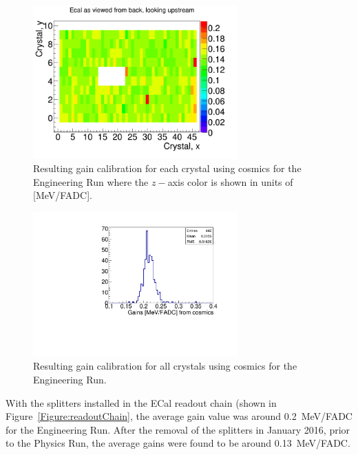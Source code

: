\begin{figure}[htb]
  \centering
      \includegraphics[width=0.7\textwidth]{pics/performance/cosmicGains2015.png}
  \caption[Resulting 2015 gain calibration in the ECal using cosmic ray muons shown by ECal module position]{Resulting gain calibration for each crystal using cosmics for the Engineering Run where the $z-$axis color is shown in units of [MeV/FADC].}
  \label{Figure:cosmicG}
\end{figure}


\begin{figure}[htb]
  \centering
      \includegraphics[width=0.7\textwidth]{pics/performance/cosmicGainsMay15.pdf}
  \caption[Distribution of the resulting 2015 gains in the ECal using cosmic ray muons]{Resulting gain calibration for all crystals using cosmics for the Engineering Run.}
  \label{Figure:cosmicGhisto}
\end{figure}

With the splitters installed in the ECal readout chain (shown in Figure~\ref{Figure:readoutChain}, the average gain value was around 0.2~MeV/FADC for the Engineering Run. After the removal of the splitters in January 2016, prior to the Physics Run, the average gains were found to be around 0.13~MeV/FADC.
